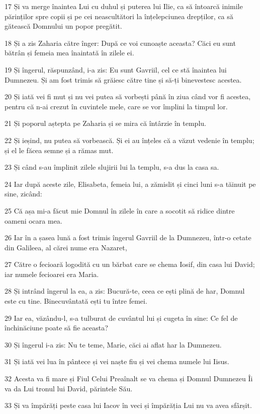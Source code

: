 \par 17 Și va merge înaintea Lui cu duhul și puterea lui Ilie, ca să întoarcă inimile părinților spre copii și pe cei neascultători la înțelepciunea drepților, ca să gătească Domnului un popor pregătit.
\par 18 Și a zis Zaharia către înger: După ce voi cunoaște aceasta? Căci eu sunt bătrân și femeia mea înaintată în zilele ei.
\par 19 Și îngerul, răspunzând, i-a zis: Eu sunt Gavriil, cel ce stă înaintea lui Dumnezeu. Și am fost trimis să grăiesc către tine și să-ți binevestesc acestea.
\par 20 Și iată vei fi mut și nu vei putea să vorbești până în ziua când vor fi acestea, pentru că n-ai crezut în cuvintele mele, care se vor împlini la timpul lor.
\par 21 Și poporul aștepta pe Zaharia și se mira că întârzie în templu.
\par 22 Și ieșind, nu putea să vorbească. Și ei au înțeles că a văzut vedenie în templu; și el le făcea semne și a rămas mut.
\par 23 Și când s-au împlinit zilele slujirii lui la templu, s-a dus la casa sa.
\par 24 Iar după aceste zile, Elisabeta, femeia lui, a zămislit și cinci luni s-a tăinuit pe sine, zicând:
\par 25 Că așa mi-a făcut mie Domnul în zilele în care a socotit să ridice dintre oameni ocara mea.
\par 26 Iar în a șasea lună a fost trimis îngerul Gavriil de la Dumnezeu, într-o cetate din Galileea, al cărei nume era Nazaret,
\par 27 Către o fecioară logodită cu un bărbat care se chema Iosif, din casa lui David; iar numele fecioarei era Maria.
\par 28 Și intrând îngerul la ea, a zis: Bucură-te, ceea ce ești plină de har, Domnul este cu tine. Binecuvântată ești tu între femei.
\par 29 Iar ea, văzându-l, s-a tulburat de cuvântul lui și cugeta în sine: Ce fel de închinăciune poate să fie aceasta?
\par 30 Și îngerul i-a zis: Nu te teme, Marie, căci ai aflat har la Dumnezeu.
\par 31 Și iată vei lua în pântece și vei naște fiu și vei chema numele lui Iisus.
\par 32 Acesta va fi mare și Fiul Celui Preaînalt se va chema și Domnul Dumnezeu Îi va da Lui tronul lui David, părintele Său.
\par 33 Și va împărăți peste casa lui Iacov în veci și împărăția Lui nu va avea sfârșit.
